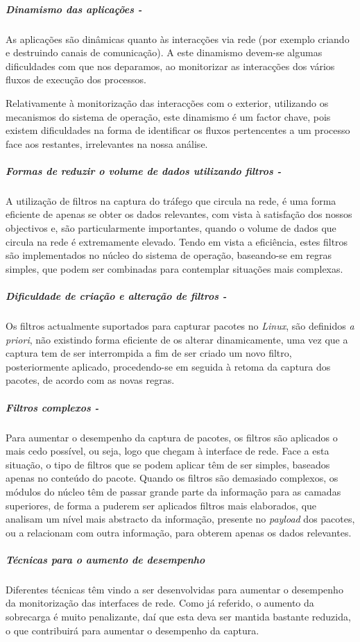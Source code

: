 \subparagraph*{Dinamismo das aplicações - }
As aplicações são dinâmicas quanto às interacções via rede (por exemplo criando e destruindo canais de comunicação).
A este dinamismo devem-se algumas dificuldades com que nos deparamos, ao monitorizar as interacções dos vários fluxos de execução dos processos.

Relativamente à monitorização das interacções com o exterior, utilizando os mecanismos do sistema de operação, este dinamismo é um factor chave, pois existem dificuldades na forma de identificar os fluxos pertencentes a um processo face aos restantes, irrelevantes na nossa análise.

\subparagraph*{Formas de reduzir o volume de dados utilizando filtros - }
A utilização de filtros na captura do tráfego que circula na rede, é uma forma eficiente de apenas se obter os dados relevantes, com vista à satisfação dos nossos objectivos e, são particularmente importantes, quando o volume de dados que circula na rede é extremamente elevado.
Tendo em vista a eficiência, estes filtros são implementados no núcleo do sistema de operação, baseando-se em regras simples, que podem ser combinadas para contemplar situações mais complexas.

\subparagraph*{Dificuldade de criação e alteração de filtros - }
Os filtros actualmente suportados para capturar pacotes no \textit{Linux}, são definidos \textit{a priori}, não existindo forma eficiente de os alterar dinamicamente, uma vez que a captura tem de ser interrompida a fim de ser criado um novo filtro, posteriormente aplicado, procedendo-se em seguida à retoma da captura dos pacotes, de acordo com as novas regras.

\subparagraph*{Filtros complexos - }
Para aumentar o desempenho da captura de pacotes, os filtros são aplicados o mais cedo possível, ou seja, logo que chegam à interface de rede.
Face a esta situação, o tipo de filtros que se podem aplicar têm de ser simples, baseados apenas no conteúdo do pacote.
Quando os filtros são demasiado complexos, os módulos do núcleo têm de passar grande parte da informação para as camadas superiores, de forma a puderem ser aplicados filtros mais elaborados, que analisam um nível mais abstracto da informação, presente no \textit{payload} dos pacotes, ou a relacionam com outra informação, para obterem apenas os dados relevantes.

\subparagraph*{Técnicas para o aumento de desempenho}

Diferentes técnicas têm vindo a ser desenvolvidas para aumentar o desempenho da monitorização das interfaces de rede.
Como já referido, o aumento da sobrecarga é muito penalizante, daí que esta deva ser mantida bastante reduzida, o que contribuirá para aumentar o desempenho da captura.


